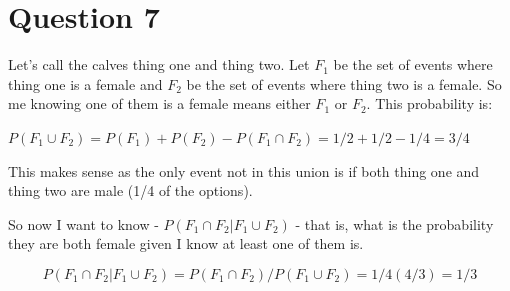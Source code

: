 \documentclass[11pt]{article}
\begin{document}
\FloatBarrier

\section*{Question 7}

Let's call the calves thing one and thing two. Let $F_1$ be the set of events where thing one is a female and $F_2$ be the set of events where thing two is a female. So me knowing one of them is a female means either $F_1$ or $F_2$. This probability is:

$P(F_1 \cup F_2) = P(F_1) + P(F_2) - P(F_1 \cap F_2)=1/2 + 1/2 - 1/4=3/4$

This makes sense as the only event not in this union is if both thing one and thing two are male (1/4 of the options). 

So now I want to know - $P(F_1 \cap F_2 | F_1 \cup F_2)$ - that is, what is the probability they are both female given I know at least one of them is. 

$$P(F_1 \cap F_2 | F_1 \cup F_2) = P(F_1 \cap F_2) / P(F_1 \cup F_2) = 1/4(4/3) = 1/3$$
\end{document}
